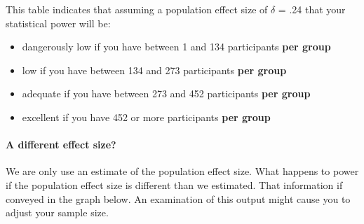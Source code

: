 \documentclass[
]{krantz}
\begin{document}
This table indicates that assuming a population effect size of \(\delta\) = .24 that your statistical power will be:

\begin{itemize}
\item
  dangerously low if you have between 1 and 134 participants \textbf{per group}
\item
  low if you have between 134 and 273 participants \textbf{per group}
\item
  adequate if you have between 273 and 452 participants \textbf{per group}
\item
  excellent if you have 452 or more participants \textbf{per group}
\end{itemize}

\hypertarget{a-different-effect-size}{%
\paragraph{A different effect size?}\label{a-different-effect-size}}

We are only use an estimate of the population effect size. What happens to power if the population effect size is different than we estimated. That information if conveyed in the graph below. An examination of this output might cause you to adjust your sample size.
\end{document}
